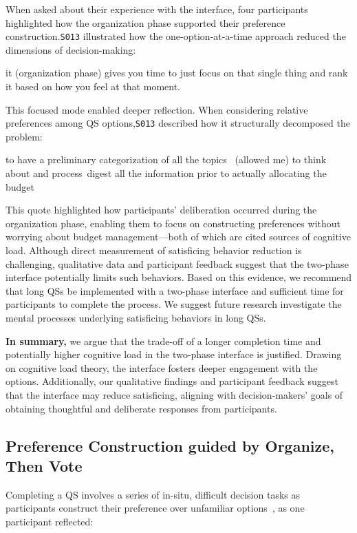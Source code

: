 When asked about their experience with the interface, four participants highlighted how the organization phase supported their preference construction.\texttt{S013} illustrated how the one-option-at-a-time approach reduced the dimensions of decision-making:

\begin{displayquote}  
\bracketellipsis it (organization phase) gives you time to just focus on that single thing and rank it based on how you feel at that moment. \hfill{}  
\end{displayquote}  

This focused mode enabled deeper reflection. When considering relative preferences among QS options,\texttt{S013} described how it structurally decomposed the problem:

\begin{displayquote}  
\bracketellipsis to have a preliminary categorization of all the topics ~\bracketellipsis (allowed me) to think about and process~\bracketellipsis digest all the information prior to actually allocating the budget~\bracketellipsis \hfill{}  
\end{displayquote}  

This quote highlighted how participants' deliberation occurred during the organization phase, enabling them to focus on constructing preferences without worrying about budget management---both of which are cited sources of cognitive load. Although direct measurement of satisficing behavior reduction is challenging, qualitative data and participant feedback suggest that the two-phase interface potentially limits such behaviors. Based on this evidence, we recommend that long QSs be implemented with a two-phase interface and sufficient time for participants to complete the process. We suggest future research investigate the mental processes underlying satisficing behaviors in long QSs. 

\textbf{In summary,} we argue that the trade-off of a longer completion time and potentially higher cognitive load in the two-phase interface is justified. Drawing on cognitive load theory, the interface fosters deeper engagement with the options. Additionally, our qualitative findings and participant feedback suggest that the interface may reduce satisficing, aligning with decision-makers' goals of obtaining thoughtful and deliberate responses from participants.

\subsection{Preference Construction guided by Organize, Then Vote}
Completing a QS involves a series of in-situ, difficult decision tasks as participants construct their preference over unfamiliar options~\cite{lichtensteinConstructionPreference2006}, as one participant reflected:

